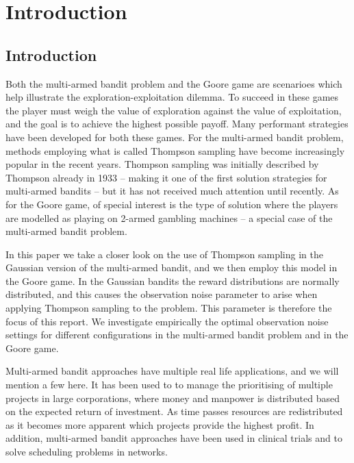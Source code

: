 \chapter{Introduction}
\label{ch:introduction}

\section{Introduction}
Both the multi-armed bandit problem and the Goore game are scenarioes which help illustrate the exploration-exploitation dilemma.
To succeed in these games the player must weigh the value of exploration against the value of exploitation, and the goal is to achieve the highest possible payoff.
Many performant strategies have been developed for both these games.
For the multi-armed bandit problem, methods employing what is called Thompson sampling have become increasingly popular in the recent years.
Thompson sampling was initially described by Thompson already in 1933 -- making it one of the first solution strategies for multi-armed bandits -- but it has not received much attention until recently.
As for the Goore game, of special interest is the type of solution where the players are modelled as playing on 2-armed gambling machines -- a special case of the multi-armed bandit problem.

In this paper we take a closer look on the use of Thompson sampling in the Gaussian version of the multi-armed bandit, and we then employ this model in the Goore game.
In the Gaussian bandits the reward distributions are normally distributed, and this causes the observation noise parameter \ob{} to arise when applying Thompson sampling to the problem.
This parameter is therefore the focus of this report.
We investigate empirically the optimal observation noise settings for different configurations in the multi-armed bandit problem and in the Goore game.

Multi-armed bandit approaches have multiple real life applications, and we will mention a few here.
It has been used to to manage the prioritising of multiple projects in large corporations, where money and manpower is distributed based on the expected return of investment.
As time passes resources are redistributed as it becomes more apparent which projects provide the highest profit.
In addition, multi-armed bandit approaches have been used in clinical trials and to solve scheduling problems in networks.

